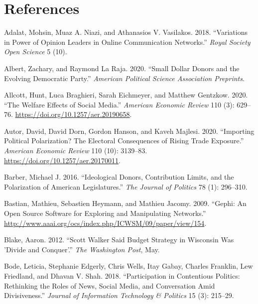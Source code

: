 \documentclass[12pt,]{article}
\begin{document}
\hypertarget{references}{%
\section*{References}\label{references}}

\hypertarget{refs}{}
\leavevmode\hypertarget{ref-adalat2018}{}%
Adalat, Mohsin, Muaz A. Niazi, and Athanasios V. Vasilakos. 2018.
``Variations in Power of Opinion Leaders in Online Communication
Networks.'' \emph{Royal Society Open Science} 5 (10).

\leavevmode\hypertarget{ref-albert2020}{}%
Albert, Zachary, and Raymond La Raja. 2020. ``Small Dollar Donors and
the Evolving Democratic Party.'' \emph{American Political Science
Association Preprints}.

\leavevmode\hypertarget{ref-allcott2020}{}%
Allcott, Hunt, Luca Braghieri, Sarah Eichmeyer, and Matthew Gentzkow.
2020. ``The Welfare Effects of Social Media.'' \emph{American Economic
Review} 110 (3): 629--76. \url{https://doi.org/10.1257/aer.20190658}.

\leavevmode\hypertarget{ref-autor2020}{}%
Autor, David, David Dorn, Gordon Hanson, and Kaveh Majlesi. 2020.
``Importing Political Polarization? The Electoral Consequences of Rising
Trade Exposure.'' \emph{American Economic Review} 110 (10): 3139--83.
\url{https://doi.org/10.1257/aer.20170011}.

\leavevmode\hypertarget{ref-barber2016a}{}%
Barber, Michael J. 2016. ``Ideological Donors, Contribution Limits, and
the Polarization of American Legislatures.'' \emph{The Journal of
Politics} 78 (1): 296--310.

\leavevmode\hypertarget{ref-gephi}{}%
Bastian, Mathieu, Sebastien Heymann, and Mathieu Jacomy. 2009. ``Gephi:
An Open Source Software for Exploring and Manipulating Networks.''
\url{http://www.aaai.org/ocs/index.php/ICWSM/09/paper/view/154}.

\leavevmode\hypertarget{ref-blake2012}{}%
Blake, Aaron. 2012. ``Scott Walker Said Budget Strategy in Wisconsin Was
'Divide and Conquer'.'' \emph{The Washington Post}, May.

\leavevmode\hypertarget{ref-bode2018}{}%
Bode, Leticia, Stephanie Edgerly, Chris Wells, Itay Gabay, Charles
Franklin, Lew Friedland, and Dhavan V. Shah. 2018. ``Participation in
Contentious Politics: Rethinking the Roles of News, Social Media, and
Conversation Amid Divisiveness.'' \emph{Journal of Information
Technology \& Politics} 15 (3): 215--29.
\end{document}
